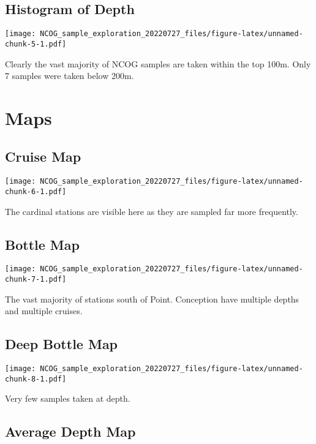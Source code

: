 \documentclass[
]{article}
\begin{document}
\hypertarget{histogram-of-depth}{%
\subsection{Histogram of Depth}\label{histogram-of-depth}}

\texttt{[image: NCOG\_sample\_exploration\_20220727\_files/figure-latex/unnamed-chunk-5-1.pdf]}

Clearly the vast majority of NCOG samples are taken within the top 100m.
Only 7 samples were taken below 200m.

\hypertarget{maps}{%
\section{Maps}\label{maps}}

\hypertarget{cruise-map}{%
\subsection{Cruise Map}\label{cruise-map}}

\texttt{[image: NCOG\_sample\_exploration\_20220727\_files/figure-latex/unnamed-chunk-6-1.pdf]}

The cardinal stations are visible here as they are sampled far more
frequently.

\hypertarget{bottle-map}{%
\subsection{Bottle Map}\label{bottle-map}}

\texttt{[image: NCOG\_sample\_exploration\_20220727\_files/figure-latex/unnamed-chunk-7-1.pdf]}

The vast majority of stations south of Point. Conception have multiple
depths and multiple cruises.

\hypertarget{deep-bottle-map}{%
\subsection{Deep Bottle Map}\label{deep-bottle-map}}

\texttt{[image: NCOG\_sample\_exploration\_20220727\_files/figure-latex/unnamed-chunk-8-1.pdf]}

Very few samples taken at depth.

\hypertarget{average-depth-map}{%
\subsection{Average Depth Map}\label{average-depth-map}}
\end{document}
